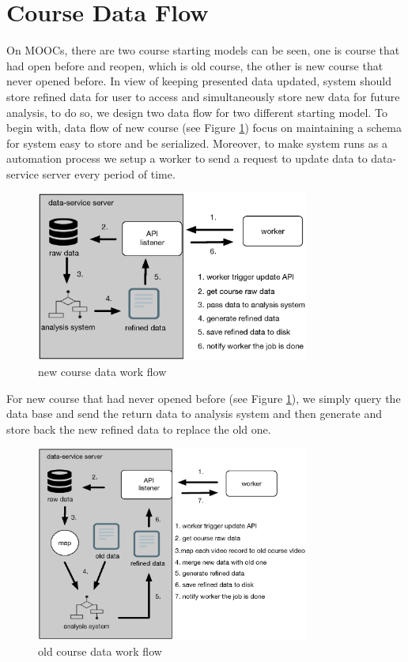 \section{Course Data Flow}
On MOOCs, there are two course starting models can be seen, one is course that had open before and reopen, which is old course, the other is new course that never opened before.
In view of keeping presented data updated, system should store refined data for user to access and simultaneously store new data for future analysis, to do so, we design two data flow for two different starting model.
To begin with, data flow of new course (see Figure \ref{fig:new-course-flow}) focus on maintaining a schema for system easy to store and be serialized.
Moreover, to make system runs as a automation process we setup a worker to send a request to update data to data-service server every period of time.

\begin{figure}[H]
    \centering
    \includegraphics[width = 0.8\textwidth]{fig/new-class-workflow.eps}
    \caption{new course data work flow}
    \label{fig:new-course-flow}
\end{figure}

For new course that had never opened before (see Figure \ref{fig:new-course-flow}), we simply query the data base and send the return data to analysis system and then generate and store back the new refined data to replace the old one.

\begin{figure}[H]
    \centering
    \includegraphics[width = 0.8\textwidth]{fig/old-course-flow.eps}
    \caption{old course data work flow}
    \label{fig:old-course-flow}
\end{figure}

